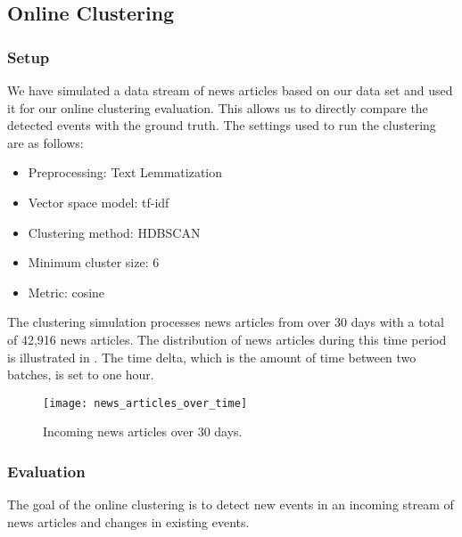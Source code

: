 \subsection{Online Clustering}
\label{subsec:5b_online_clustering}

\subsubsection{Setup}
\label{subsubsec:5b_setup}

We have simulated a data stream of news articles based on our data set and used
it for our online clustering evaluation.
This allows us to directly compare the detected events with the ground truth.
The settings used to run the clustering are as follows:

\begin{itemize}
    \item Preprocessing: Text Lemmatization
    \item Vector space model: tf-idf
    \item Clustering method: HDBSCAN
    \item Minimum cluster size: 6
    \item Metric: cosine
\end{itemize}

The clustering simulation processes news articles from over 30 days with a total of 42,916 news articles.
The distribution of news articles during this time period is illustrated in .
The time delta, which is the amount of time between two batches, is set to one hour.

\begin{figure}[h]
    \centering
    \texttt{[image: news\_articles\_over\_time]}
    \caption{Incoming news articles over 30 days.}
    \label{fig:news_articles_over_time}
\end{figure}

\subsubsection{Evaluation}
\label{subsubsec:5b_evaluation}

The goal of the online clustering is to detect new events in an incoming stream
of news articles and changes in existing events.

